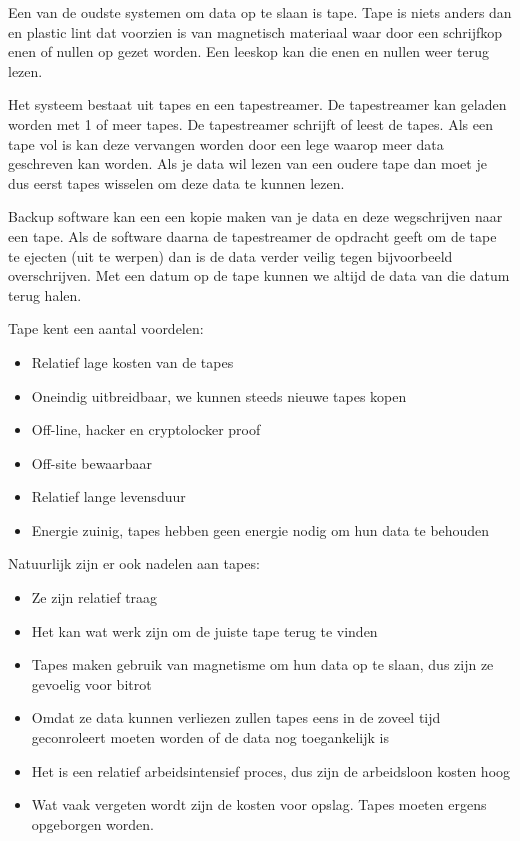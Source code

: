Een van de oudste systemen om data op te slaan is tape. Tape is niets anders dan en plastic lint dat voorzien is van magnetisch materiaal waar door een schrijfkop enen of nullen op gezet worden. Een leeskop kan die enen en nullen weer terug lezen.

Het systeem bestaat uit tapes en een tapestreamer. De tapestreamer kan geladen worden met 1 of meer tapes. De tapestreamer schrijft of leest de tapes. Als een tape vol is kan deze vervangen worden door een lege waarop meer data geschreven kan worden. Als je data wil lezen van een oudere tape dan moet je dus eerst tapes wisselen om deze data te kunnen lezen.

Backup software kan een een kopie maken van je data en deze wegschrijven naar een tape. Als de software daarna de tapestreamer de opdracht geeft om de tape te ejecten (uit te werpen) dan is de data verder veilig tegen bijvoorbeeld overschrijven. Met een datum op de tape kunnen we altijd de data van die datum terug halen.

Tape kent een aantal voordelen:
\begin{itemize}
\item Relatief lage kosten van de tapes
\item Oneindig uitbreidbaar, we kunnen steeds nieuwe tapes kopen
\item Off-line, hacker en cryptolocker proof
\item Off-site bewaarbaar
\item Relatief lange levensduur
\item Energie zuinig, tapes hebben geen energie nodig om hun data te behouden
\end{itemize}

Natuurlijk zijn er ook nadelen aan tapes:
\begin{itemize}
\item Ze zijn relatief traag
\item Het kan wat werk zijn om de juiste tape terug te vinden
\item Tapes maken gebruik van magnetisme om hun data op te slaan, dus zijn ze gevoelig voor bitrot
\item Omdat ze data kunnen verliezen zullen tapes eens in de zoveel tijd geconroleert moeten worden of de data nog toegankelijk is
\item Het is een relatief arbeidsintensief proces, dus zijn de arbeidsloon kosten hoog
\item Wat vaak vergeten wordt zijn de kosten voor opslag. Tapes moeten ergens opgeborgen worden.
\end{itemize}

